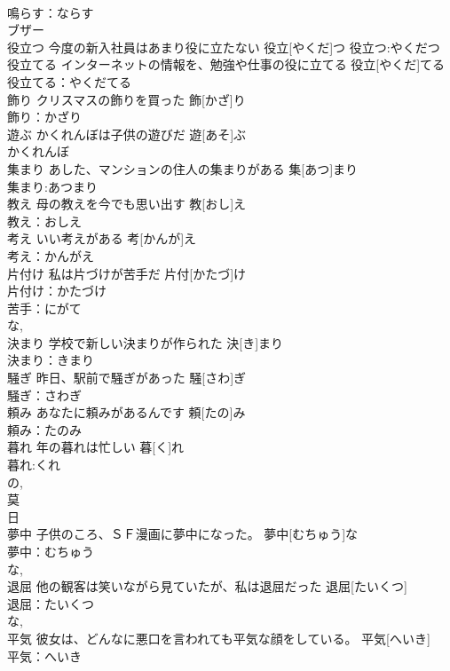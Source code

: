 \documentclass[8pt]{extreport}
\begin{document}
\begin{CJK}{UTF8}{min}
\\	鳴らす：ならす
\\	ブザー
\\	役立つ	今度の新入社員はあまり役に立たない	役立[やくだ]つ			役立つ:やくだつ
\\	役立てる	インターネットの情報を、勉強や仕事の役に立てる	役立[やくだ]てる			役立てる：やくだてる
\\	飾り	クリスマスの飾りを買った	飾[かざ]り	
\\	飾り：かざり
\\	遊ぶ	かくれんぼは子供の遊びだ	遊[あそ]ぶ	
\\	かくれんぼ
\\	集まり	あした、マンションの住人の集まりがある	集[あつ]まり	
\\	集まり:あつまり
\\	教え	母の教えを今でも思い出す	教[おし]え	
\\	教え：おしえ
\\	考え	いい考えがある	考[かんが]え	
\\	考え：かんがえ
\\	片付け	私は片づけが苦手だ	片付[かたづ]け	
\\	片付け：かたづけ
\\	苦手：にがて
\\	な, 
\\	決まり	学校で新しい決まりが作られた	決[き]まり	
\\	決まり：きまり
\\	騒ぎ	昨日、駅前で騒ぎがあった	騒[さわ]ぎ	
\\	騒ぎ：さわぎ
\\	頼み	あなたに頼みがあるんです	頼[たの]み	
\\	頼み：たのみ
\\	暮れ	年の暮れは忙しい	暮[く]れ	
\\	暮れ:くれ
\\	の, 
\\	莫 
\\	日 
\\	夢中	子供のころ、ＳＦ漫画に夢中になった。	夢中[むちゅう]な	
\\	夢中：むちゅう
\\	な, 
\\	退屈	他の観客は笑いながら見ていたが、私は退屈だった	退屈[たいくつ]	
\\	退屈：たいくつ
\\	な, 
\\	平気	彼女は、どんなに悪口を言われても平気な顔をしている。	平気[へいき]	
\\	平気：へいき

\end{CJK}
\end{document}
